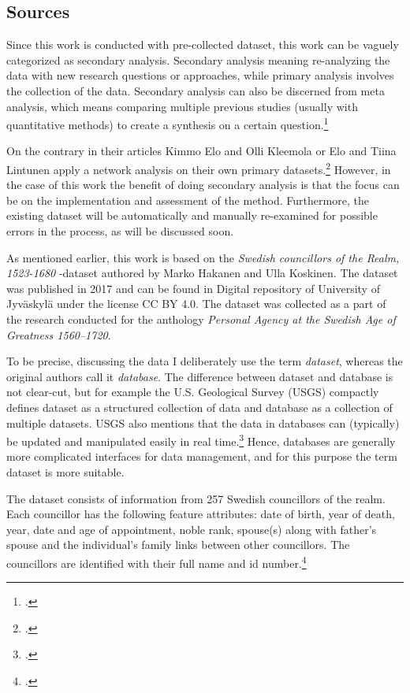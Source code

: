 \subsection{Sources}
\label{sources}
Since this work is conducted with pre-collected dataset, this work can be vaguely categorized as secondary analysis. Secondary analysis meaning re-analyzing the data with new research questions or approaches, while primary analysis involves the collection of the data. Secondary analysis can also be discerned from meta analysis, which means comparing multiple previous studies (usually with quantitative methods) to create a synthesis on a certain question.\footcite[p. 4-5.]{meta-analysis} 

On the contrary in their articles Kimmo Elo and Olli Kleemola or Elo and Tiina Lintunen apply a network analysis on their own primary datasets.\footcites{eloAklee15}{LintunenAndElo2019} However, in the case of this work the benefit of doing secondary analysis is that the focus can be on the implementation and assessment of the method. Furthermore, the existing dataset will be automatically and manually re-examined for possible errors in the process, as will be discussed soon. 

As mentioned earlier, this work is based on the \textit{Swedish councillors of the Realm, 1523-1680} -dataset authored by Marko Hakanen and Ulla Koskinen. The dataset was published in 2017 and can be found in Digital repository of University of Jyväskylä under the license CC BY 4.0. The dataset was collected as a part of the research conducted for the anthology \textit{Personal Agency at the Swedish Age of Greatness 1560–1720}.

To be precise, discussing the data I deliberately use the term \textit{dataset}, whereas the original authors call it \textit{database}. The difference between dataset and database is not clear-cut, but for example the U.S. Geological Survey (USGS) compactly defines dataset as a structured collection of data and database as a collection of multiple datasets. USGS also mentions that the data in databases can (typically) be updated and manipulated easily in real time.\footcite{usgs} Hence, databases are generally more complicated interfaces for data management, and for this purpose the term dataset is more suitable.

The dataset consists of information from 257 Swedish councillors of the realm. Each councillor has the following feature attributes: date of birth, year of death, year, date and age of appointment, noble rank, spouse(s) along with father's spouse and the individual's family links between other councillors. The councillors are identified with their full name and id number.\footcites[p. 48.]{HakanenAKoskinen2017}{councillorsDS}

